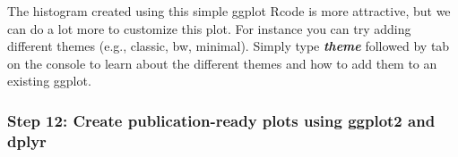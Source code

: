 \documentclass[]{article}
\newenvironment{Shaded}{\begin{snugshade}}{\end{snugshade}}
\newcommand{\CommentTok}[1]{\textcolor[rgb]{0.56,0.35,0.01}{\textit{#1}}}
\newcommand{\DataTypeTok}[1]{\textcolor[rgb]{0.13,0.29,0.53}{#1}}
\newcommand{\DecValTok}[1]{\textcolor[rgb]{0.00,0.00,0.81}{#1}}
\newcommand{\KeywordTok}[1]{\textcolor[rgb]{0.13,0.29,0.53}{\textbf{#1}}}
\newcommand{\NormalTok}[1]{#1}
\newcommand{\OperatorTok}[1]{\textcolor[rgb]{0.81,0.36,0.00}{\textbf{#1}}}
\newcommand{\OtherTok}[1]{\textcolor[rgb]{0.56,0.35,0.01}{#1}}
\newcommand{\StringTok}[1]{\textcolor[rgb]{0.31,0.60,0.02}{#1}}
\begin{document}
\begin{Shaded}
\end{Shaded}

The histogram created using this simple ggplot Rcode is more attractive,
but we can do a lot more to customize this plot. For instance you can
try adding different themes (e.g., classic, bw, minimal). Simply type
\textbf{\emph{theme}} followed by tab on the console to learn about the
different themes and how to add them to an existing ggplot.

\hypertarget{step-12-create-publication-ready-plots-using-ggplot2-and-dplyr}{%
\subsubsection{Step 12: Create publication-ready plots using ggplot2 and
dplyr}\label{step-12-create-publication-ready-plots-using-ggplot2-and-dplyr}}
\end{document}
